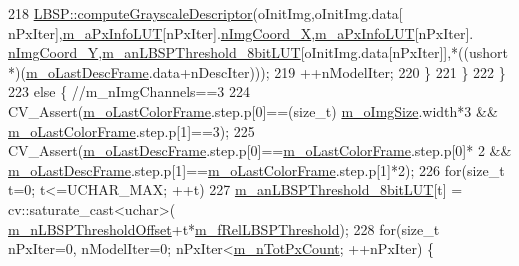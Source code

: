 \begin{DoxyCode}
218                 \mbox{\hyperlink{class_l_b_s_p_a4a5f635868b6b81ba53df2692ee3dfd8}{LBSP::computeGrayscaleDescriptor}}(oInitImg,oInitImg.data[
      nPxIter],\mbox{\hyperlink{class_background_subtractor_l_b_s_p_a74e73d4832ccdef652d93756582024db}{m\_aPxInfoLUT}}[nPxIter].\mbox{\hyperlink{struct_background_subtractor_l_b_s_p_1_1_px_info_base_a10966fe72f000045adede9e853156b48}{nImgCoord\_X}},\mbox{\hyperlink{class_background_subtractor_l_b_s_p_a74e73d4832ccdef652d93756582024db}{m\_aPxInfoLUT}}[nPxIter].
      \mbox{\hyperlink{struct_background_subtractor_l_b_s_p_1_1_px_info_base_a42cb6eecda647b2a11b90ea420f2bc31}{nImgCoord\_Y}},\mbox{\hyperlink{class_background_subtractor_l_b_s_p_aefe69d94f08b2c4ba73ad1d254ad9153}{m\_anLBSPThreshold\_8bitLUT}}[oInitImg.data[nPxIter]],*((ushort
      *)(\mbox{\hyperlink{class_background_subtractor_l_b_s_p_a9c637c0b87cac495887295690d83ba13}{m\_oLastDescFrame}}.data+nDescIter)));
219                 ++nModelIter;
220             \}
221         \}
222     \}
223     \textcolor{keywordflow}{else} \{ \textcolor{comment}{//m\_nImgChannels==3}
224         CV\_Assert(\mbox{\hyperlink{class_background_subtractor_l_b_s_p_ab1dc003792ab1d0b881a6fd10e0e29b3}{m\_oLastColorFrame}}.step.p[0]==(\textcolor{keywordtype}{size\_t})
      \mbox{\hyperlink{class_background_subtractor_l_b_s_p_a732d5e6ae35fb0e858cadb3af5ce08a2}{m\_oImgSize}}.width*3 && \mbox{\hyperlink{class_background_subtractor_l_b_s_p_ab1dc003792ab1d0b881a6fd10e0e29b3}{m\_oLastColorFrame}}.step.p[1]==3);
225         CV\_Assert(\mbox{\hyperlink{class_background_subtractor_l_b_s_p_a9c637c0b87cac495887295690d83ba13}{m\_oLastDescFrame}}.step.p[0]==\mbox{\hyperlink{class_background_subtractor_l_b_s_p_ab1dc003792ab1d0b881a6fd10e0e29b3}{m\_oLastColorFrame}}.step.p[0]*
      2 && \mbox{\hyperlink{class_background_subtractor_l_b_s_p_a9c637c0b87cac495887295690d83ba13}{m\_oLastDescFrame}}.step.p[1]==\mbox{\hyperlink{class_background_subtractor_l_b_s_p_ab1dc003792ab1d0b881a6fd10e0e29b3}{m\_oLastColorFrame}}.step.p[1]*2);
226         \textcolor{keywordflow}{for}(\textcolor{keywordtype}{size\_t} t=0; t<=UCHAR\_MAX; ++t)
227             \mbox{\hyperlink{class_background_subtractor_l_b_s_p_aefe69d94f08b2c4ba73ad1d254ad9153}{m\_anLBSPThreshold\_8bitLUT}}[t] = cv::saturate\_cast<uchar>(
      \mbox{\hyperlink{class_background_subtractor_l_b_s_p_a209eb6aaa34e8ad8e565e79f85404e24}{m\_nLBSPThresholdOffset}}+t*\mbox{\hyperlink{class_background_subtractor_l_b_s_p_ad759c645b14e9b16bf3940cae862df32}{m\_fRelLBSPThreshold}});
228         \textcolor{keywordflow}{for}(\textcolor{keywordtype}{size\_t} nPxIter=0, nModelIter=0; nPxIter<\mbox{\hyperlink{class_background_subtractor_l_b_s_p_a9d1e247267afbddb7032bdcabd67d931}{m\_nTotPxCount}}; ++nPxIter) \{

\end{DoxyCode}
